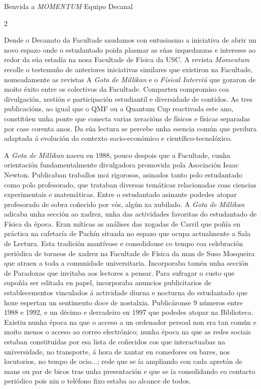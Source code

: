 \Titular*%
{profesorado}%
{Benvida a \textit{MOMENTUM}}%
{Equipo Decanal}%
{}%

\vspace{-0.3cm}

\begin{multicols}{2}

Dende o Decanato da Facultade saudamos con entusiasmo a iniciativa de abrir un
novo espazo onde o estudantado poida plasmar as súas inquedanzas e intereses ao
redor da súa estadía na nosa Facultade de Física da USC. A revista
\textit{Momentum} recolle o testemuño de anteriores iniciativas similares que
existiron na Facultade, nomeadamente as revistas A \textit{Gota de Millikan} e
o \textit{Físical Interviú} que gozaron de moito éxito entre os colectivos da
Facultade. Comparten compromiso coa divulgación, xestión e participación
estudiantil e diversidade de contidos. As tres publicacións, ao igual que o QMF
ou a Quantum Cup reactivada este ano, constitúen unha ponte que conecta varias
xeracións de físicos e físicas separadas por case corenta anos. Da súa lectura
se percebe unha esencia común que perdura adaptada á evolución do contexto
socio-económico e científico-tecnolóxico.

A \textit{Gota de Millikan} naceu en 1988, pouco despois que a Facultade, cunha
orientación fundamentalmente divulgadora promovida pola Asociación Isaac
Newton. Publicaban traballos moi rigorosos, asinados tanto polo estudantado
como polo profesorado, que trataban diversas temáticas relacionadas coas
ciencias experimentais e matemáticas. Entre o estudantado asinante podedes
atopar profesorado de sobra coñecido por vós, algún xa xubilado. A \textit{Gota
de Millikan} adicaba unha sección ao xadrez, unha das actividades favoritas do
estudantado de Física da época. Eran míticas as análises das xogadas de Carril
que poñía en práctica na cafetaría de Pachín situada no espazo que ocupa
actualmente a Sala de Lectura. Esta tradición mantívose e consolidouse co tempo
coa celebración periódica de torneos de xadrez na Facultade de Física da man de
Suso Mosqueira que atraen a toda a comunidade universitaria. Incorporaba tamén
unha sección de Paradoxas que invitaba aos lectores a pensar. Para sufragar o
custo que supoñía ser editada en papel, incorporaba anuncios publicitarios de
establecementos vinculados á actividade diurna e nocturna do estudantado que
hoxe espertan un sentimento doce de nostalxia. Publicáronse 9 números entre
1988 e 1992, e un décimo e derradeiro en 1997 que podedes atopar na Biblioteca.
Existiu nunha época na que o acceso a un ordenador persoal non era tan común e
moito menos o acceso ao correo electrónico; nunha época na que as redes sociais
estaban constituídas por esa lista de coñecidos cos que interactuabas na
universidade, no transporte, á hora de xantar en comedores ou bares, nos
locutorios, no tempo de ocio...; rede que se ía ampliando con cada apretón de
mans ou par de bicos tras unha presentación e que se ía consolidando co
contacto periódico pois nin o teléfono fixo estaba ao alcance de todos.


\end{multicols}
